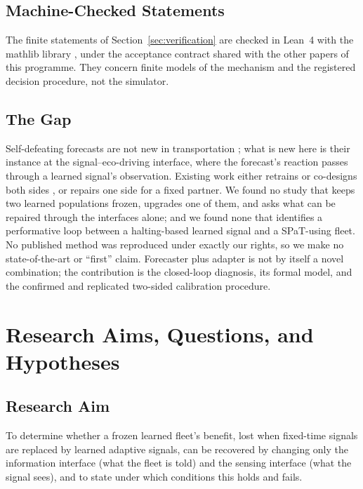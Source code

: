 \subsection{Machine-Checked Statements}
The finite statements of Section~\ref{sec:verification} are checked in Lean~4 \cite{moura2021} with the mathlib library
\cite{mathlib2020}, under the acceptance contract shared with the other papers of this programme. They concern finite models of the
mechanism and the registered decision procedure, not the simulator.

\subsection{The Gap}
Self-defeating forecasts are not new in transportation \cite{bottom2000}; what is new here is their instance at the
signal--eco-driving interface, where the forecast's reaction passes through a learned signal's observation. Existing work either retrains
or co-designs both sides \cite{guo2023,zhang2026,gerner2026forl}, or repairs one side for a fixed partner. We found no study that keeps two learned
populations frozen, upgrades one of them, and asks what can be repaired through the interfaces alone; and we found none that identifies a
performative loop between a halting-based learned signal and a SPaT-using fleet. No published method was reproduced under exactly our
rights, so we make no state-of-the-art or ``first'' claim. Forecaster plus adapter is not by itself a novel combination; the contribution
is the closed-loop diagnosis, its formal model, and the confirmed and replicated two-sided calibration procedure.

\section{Research Aims, Questions, and Hypotheses}\label{sec:aims}
\subsection{Research Aim}
To determine whether a frozen learned fleet's benefit, lost when fixed-time signals are replaced by learned adaptive signals, can be recovered by
changing only the information interface (what the fleet is told) and the sensing interface (what the signal sees), and to state under
which conditions this holds and fails.

